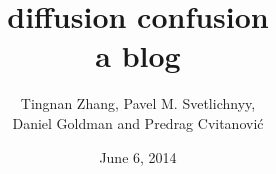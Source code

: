 \documentclass[10pt,openany]{book}
\begin{document}
        \date{June 6, 2014} \Private{\date{\today}}

\title{ 			diffusion confusion
       \\ \Huge 	a blog
        \\\vspace{1.0cm}
        }\author{
		Tingnan Zhang,
        Pavel M. Svetlichnyy,
		\\
        Daniel Goldman
         and
        Predrag Cvitanovi\'{c}
        }

%
\maketitle

\thispagestyle{empty}
\tableofcontents



\newpage





\end{document}
